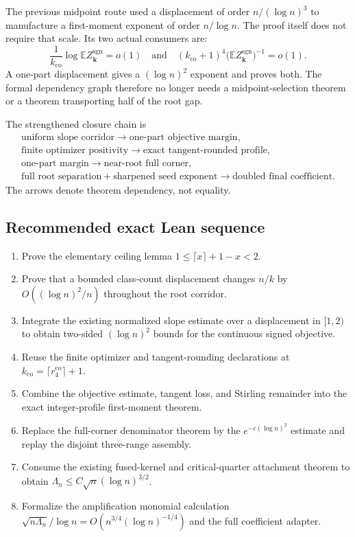 The previous midpoint route used a displacement of order
$n/(\log n)^3$ to manufacture a first-moment exponent of order
$n/\log n$. The proof itself does not require that scale. Its two actual
consumers are:
\[
  \frac{1}{k_{\mathrm{co}}}
  \log\mathbb E Z_{\mathbf k}^{\mathrm{sgn}}=o(1)
  \quad\text{and}\quad
  (k_{\mathrm{co}}+1)^4
  \bigl(\mathbb E Z_{\mathbf k}^{\mathrm{sgn}}\bigr)^{-1}=o(1).
\]
A one-part displacement gives a $(\log n)^2$ exponent and proves both. The
formal dependency graph therefore no longer needs a midpoint-selection theorem
or a theorem transporting half of the root gap.

The strengthened closure chain is
\[
\begin{gathered}
  \text{uniform slope corridor}
  \longrightarrow
  \text{one-part objective margin},\\
  \text{finite optimizer positivity}
  \longrightarrow
  \text{exact tangent-rounded profile},\\
  \text{one-part margin}
  \longrightarrow
  \text{near-root full corner},\\
  \text{full root separation}
  +\text{sharpened seed exponent}
  \longrightarrow
  \text{doubled final coefficient}.
\end{gathered}
\]
The arrows denote theorem dependency, not equality.

\subsection{Recommended exact Lean sequence}

\begin{enumerate}
\item Prove the elementary ceiling lemma
$1\le\lceil x\rceil+1-x<2$.
\item Prove that a bounded class-count displacement changes $n/k$ by
$O((\log n)^2/n)$ throughout the root corridor.
\item Integrate the existing normalized slope estimate over a displacement in
$[1,2)$ to obtain two-sided $(\log n)^2$ bounds for the continuous signed
objective.
\item Reuse the finite optimizer and tangent-rounding declarations at
$k_{\mathrm{co}}=\lceil r_4^{\mathrm{co}}\rceil+1$.
\item Combine the objective estimate, tangent loss, and Stirling remainder into
the exact integer-profile first-moment theorem.
\item Replace the full-corner denominator theorem by the
$e^{-c(\log n)^2}$ estimate and replay the disjoint three-range assembly.
\item Consume the existing fused-kernel and critical-quarter attachment theorem
to obtain
$\Lambda_n\le C\sqrt n(\log n)^{3/2}$.
\item Formalize the amplification monomial calculation
$\sqrt{n\Lambda_n}/\log n
 =O(n^{3/4}(\log n)^{-1/4})$ and the full coefficient adapter.
\end{enumerate}

